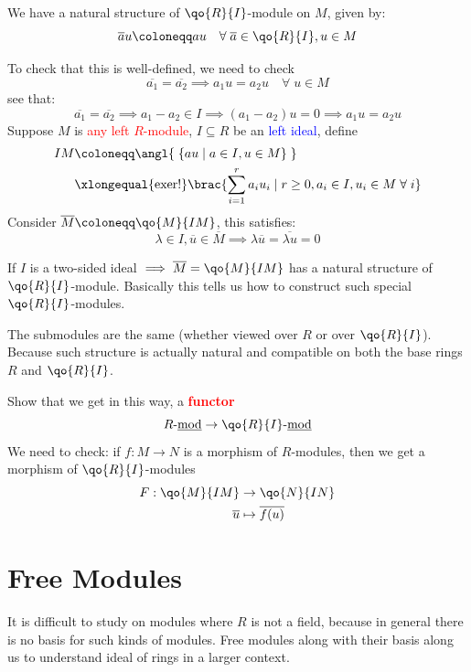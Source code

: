 \begin{claim}
	We have a natural structure of \( \qo{R}{I} \)-module on \( M \), given by:
	\[
		\overline{a}u \coloneqq  au \quad \forall \; \overline{a} \in \qo{R}{I}, u\in M
	\]
\end{claim}
To check that this is well-defined, we need to check
\[
	\overline{a_1} = \overline{a_2} \implies a_1 u = a_2 u \quad \forall \; u\in M
\]
see that:
\[
	\overline{a_1} = \overline{a_2} \implies a_1 - a_2 \in I \implies (a_1 - a_2)u = 0 \implies a_1 u
	= a_2 u
\]
Suppose \( M \) is \textcolor{red}{any left \( R \)-module}, \( I \subseteq R \) be an \textcolor{blue}{left ideal},
define
\[
	\begin{aligned}
		IM & \coloneqq  \angl{\;\{au \; | \; a\in I, u \in M\} \; }                                     \\
		   & \xlongequal{\text{exer!}} \brac{\sum_{i=1}^r a_i u_i \; | \; r\geq 0, a_i \in I, u_i \in M
			\; \forall \; i}
	\end{aligned}
\]
Consider \( \overline{M} \coloneqq \qo{M}{IM} \), this satisfies:
\[
	\lambda \in I, \overline{u} \in \overline{M} \implies \lambda \overline{u} = \overline{\lambda u}
	= 0
\]
\begin{conclusion}
	If \( I \) is a two-sided ideal \( \implies \overline{M} = \qo{M}{IM} \) has a natural structure of \( \qo{R}{I} \)-module.
	Basically this tells us how to construct such special \( \qo{R}{I} \)-modules.
\end{conclusion}

\begin{note}
	The submodules are the same (whether viewed over \( R \) or over \( \qo{R}{I} \)). Because such
	structure is actually natural and compatible on both the base rings \( R \) and \( \qo{R}{I} \).
\end{note}

\begin{exercise}
	Show that we get in this way, a \textbf{\textcolor{red}{functor}}
	\[
		R\text{-}\underline{\text{mod}} \to \qo{R}{I}\text{-}\underline{\text{mod}}
	\]
	We need to check: if \( f: M\to N \) is a morphism of \( R \)-modules, then we get a morphism of
	\( \qo{R}{I} \)-modules
	\[
		\begin{aligned}
			F: \qo{M}{IM} & \to \qo{N}{IN}          \\
			\overline{u}  & \mapsto \overline{f(u)}
		\end{aligned}
	\]
\end{exercise}

\section{Free Modules}
It is difficult to study on modules where \( R \) is not a field, because in general there is no
basis for such kinds of modules. Free modules along with their basis along us to understand ideal of
rings in a larger context.

